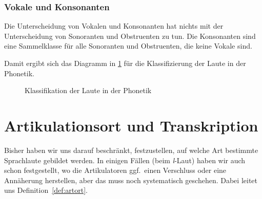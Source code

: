 \newpage



\subsubsection{Vokale und Konsonanten}

Die Unterscheidung von Vokalen und Konsonanten hat nichts mit der Unterscheidung von Sonoranten und Obstruenten zu tun.
Die Konsonanten sind eine Sammelklasse für alle Sonoranten und Obstruenten, die keine Vokale sind.


Damit ergibt sich das Diagramm in \ref{fig:lautklassen} für die Klassifizierung der Laute in der Phonetik.

\begin{figure}[!h]
  \centering
  \caption{Klassifikation der Laute in der Phonetik}
  \label{fig:lautklassen}
\end{figure}

\section{Artikulationsort und Transkription}

\label{sec:artort}

Bisher haben wir uns darauf beschränkt, festzustellen, auf welche Art bestimmte Sprachlaute gebildet werden.
In einigen Fällen (\zB beim \textit{l}-Laut) haben wir auch schon festgestellt, wo die Artikulatoren ggf.\ einen Verschluss oder eine Annäherung herstellen, aber das muss noch systematisch geschehen.
Dabei leitet uns Definition~\ref{def:artort}.

